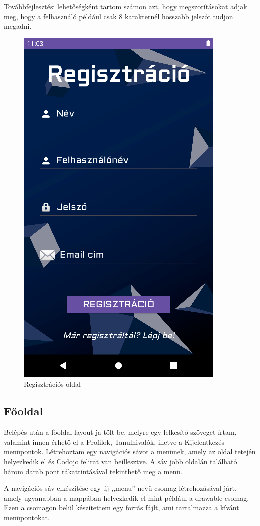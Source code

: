 \documentclass{thesis-ekf}
\begin{document}
Továbbfejlesztési lehetőségként tartom számon azt, hogy megszorításokat adjak meg, hogy a felhasználó például csak 8 karakternél hosszabb jelszót tudjon megadni.
\begin{figure}[tbh]
	\centering
	\includegraphics[width=0.6\linewidth]{regisztració}
	\caption{Regisztrációs oldal}
	\label{regisztracio}
\end{figure}

\subsection{Főoldal}
Belépés után a főoldal layout-ja tölt be, melyre egy lelkesítő szöveget írtam, valamint innen érhető el a Profilok, Tanulnivalók, illetve a Kijelentkezés menüpontok. Létrehoztam egy navigációs sávot a menünek, amely az oldal tetején helyezkedik el és Codojo felirat van beillesztve. A sáv jobb oldalán található három darab pont rákattintásával tekinthető meg a menü.

A navigációs sáv elkészítése egy új ,,menu'' nevű csomag létrehozásával járt, amely ugyanabban a mappában helyezkedik el mint például a drawable csomag. Ezen a csomagon belül készítettem egy forrás fájlt, ami tartalmazza a kívánt menüpontokat.
\end{document}
